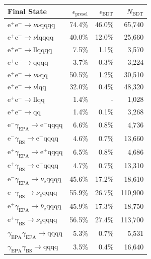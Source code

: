 \begin{table}[h!]
\centering
\begin{tabular}{ l r r r }
\hline
Final State & $\epsilon_{\text{presel}}$ & $\epsilon_{\text{BDT}}$ & $N_{\text{BDT}}$ \\ 
\hline
$\text{e}^{+}\text{e}^{-} \rightarrow \nu{\nu}\text{qqqq}$ & 74.4\% & 46.0\% & 65,740 \\
$\text{e}^{+}\text{e}^{-} \rightarrow \nu\text{lqqqq}$ & 40.0\% & 12.0\% & 25,660 \\
$\text{e}^{+}\text{e}^{-} \rightarrow \text{llqqqq}$ & 7.5\% & 1.1\% & 3,570 \\
$\text{e}^{+}\text{e}^{-} \rightarrow \text{qqqq}$ & 3.7\% & 0.3\% & 3,224 \\
$\text{e}^{+}\text{e}^{-} \rightarrow \nu{\nu}\text{qq}$ & 50.5\% & 1.2\% & 30,510 \\
$\text{e}^{+}\text{e}^{-} \rightarrow \nu\text{lqq}$ & 32.0\% & 0.4\% & 48,320 \\
$\text{e}^{+}\text{e}^{-} \rightarrow \text{llqq}$ & 1.4\% & - & 1,028 \\
$\text{e}^{+}\text{e}^{-} \rightarrow \text{qq}$ & 1.4\% & 0.1\% & 3,268 \\
$\text{e}^{-}\gamma_{\text{EPA}} \rightarrow \text{e}^{-}\text{qqqq}$ & 6.6\% & 0.8\% & 4,736 \\
$\text{e}^{-}\gamma_{\text{BS}} \rightarrow \text{e}^{-}\text{qqqq}$ & 4.6\% & 0.7\% & 13,660 \\
$\text{e}^{+}\gamma_{\text{EPA}} \rightarrow \text{e}^{+}\text{qqqq}$ & 6.5\% & 0.8\% & 4,686 \\
$\text{e}^{+}\gamma_{\text{BS}} \rightarrow \text{e}^{+}\text{qqqq}$ & 4.7\% & 0.7\% & 13,310 \\
$\text{e}^{-}\gamma_{\text{EPA}} \rightarrow \nu_{\text{e}}\text{qqqq}$ & 45.6\% & 17.2\% & 18,610 \\
$\text{e}^{-}\gamma_{\text{BS}} \rightarrow \nu_{\text{e}}\text{qqqq}$ & 55.9\% & 26.7\% & 110,900 \\
$\text{e}^{+}\gamma_{\text{EPA}} \rightarrow \overline{\nu}_{\text{e}}\text{qqqq}$ & 45.9\% & 17.3\% & 18,750 \\
$\text{e}^{+}\gamma_{\text{BS}} \rightarrow \overline{\nu}_{\text{e}}\text{qqqq}$ & 56.5\% & 27.4\% & 113,700 \\
$\gamma_{\text{EPA}}\gamma_{\text{EPA}} \rightarrow \text{qqqq}$ & 5.3\% & 0.7\% & 5,531 \\
$\gamma_{\text{EPA}}\gamma_{\text{BS}} \rightarrow \text{qqqq}$ & 3.5\% & 0.4\% & 16,640 \\

\end{tabular}
\end{table}
